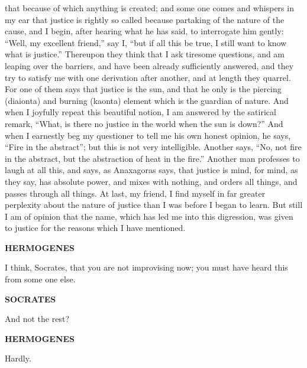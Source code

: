 \documentclass[11pt,letter]{article}
\begin{document}
that because of which anything is created; and some one comes and whispers in my ear that justice is rightly so called because partaking of the nature of the cause, and I begin, after hearing what he has said, to interrogate him gently:  “Well, my excellent friend,” say I, “but if all this be true, I still want to know what is justice.” Thereupon they think that I ask tiresome questions, and am leaping over the barriers, and have been already sufficiently answered, and they try to satisfy me with one derivation after another, and at length they quarrel. For one of them says that justice is the sun, and that he only is the piercing (diaionta) and burning (kaonta) element which is the guardian of nature. And when I joyfully repeat this beautiful notion, I am answered by the satirical remark, “What, is there no justice in the world when the sun is down?” And when I earnestly beg my questioner to tell me his own honest opinion, he says, “Fire in the abstract”; but this is not very intelligible. Another says, “No, not fire in the abstract, but the abstraction of heat in the fire.” Another man professes to laugh at all this, and says, as Anaxagoras says, that justice is mind, for mind, as they say, has absolute power, and mixes with nothing, and orders all things, and passes through all things. At last, my friend, I find myself in far greater perplexity about the nature of justice than I was before I began to learn. But still I am of opinion that the name, which has led me into this digression, was given to justice for the reasons which I have mentioned.

\par \textbf{HERMOGENES}
\par   I think, Socrates, that you are not improvising now; you must have heard this from some one else.

\par \textbf{SOCRATES}
\par   And not the rest?

\par \textbf{HERMOGENES}
\par   Hardly.
\end{document}
